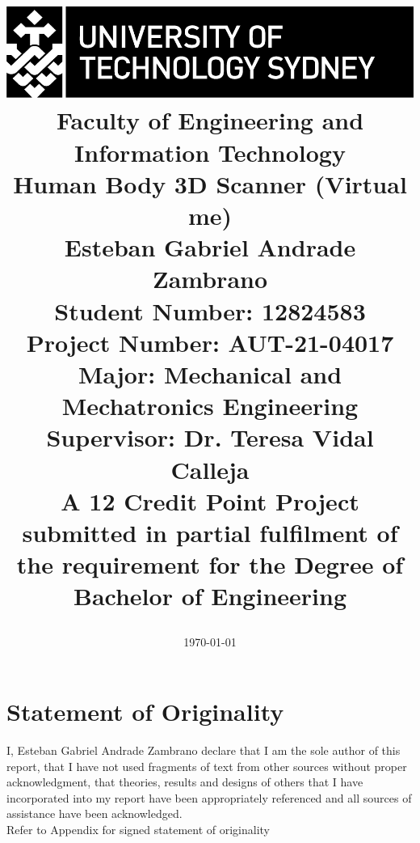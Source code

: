 \documentclass[12pt]{report}
\begin{document}
\begin{titlepage}

   

    \title{ \includegraphics[scale=1.7]{utslogo.jpg}\\[1cm]  
    Faculty of Engineering and Information Technology\\[1.0cm] 
    \Large{\textbf{Human Body 3D Scanner (Virtual me)}}\\[1.0cm] 
    {Esteban Gabriel Andrade Zambrano\\
    Student Number: 12824583\\
    Project Number: AUT-21-04017\\
    Major: Mechanical and Mechatronics Engineering\\
    Supervisor: Dr. Teresa Vidal Calleja\\[2.0cm]
    \small{A 12 Credit Point Project submitted in partial fulfilment of the requirement for the Degree of Bachelor of Engineering}
    }
    \date{\today}   
   }
   
\end{titlepage}
\maketitle  
\cleardoublepage

\chapter*{Statement of Originality}
I, Esteban Gabriel Andrade Zambrano  declare that I am the sole author of this report, that I have not used fragments of text from other sources without proper acknowledgment, that theories, results and designs of others that I have incorporated into my report have been appropriately referenced and all sources of assistance have been acknowledged.\\[2 cm]
Refer to Appendix for signed statement of originality
\end{document}
